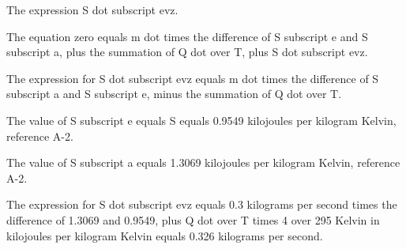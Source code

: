 The expression S dot subscript evz.

The equation zero equals m dot times the difference of S subscript e and S subscript a, plus the summation of Q dot over T, plus S dot subscript evz.

The expression for S dot subscript evz equals m dot times the difference of S subscript a and S subscript e, minus the summation of Q dot over T.

The value of S subscript e equals S equals 0.9549 kilojoules per kilogram Kelvin, reference A-2.

The value of S subscript a equals 1.3069 kilojoules per kilogram Kelvin, reference A-2.

The expression for S dot subscript evz equals 0.3 kilograms per second times the difference of 1.3069 and 0.9549, plus Q dot over T times 4 over 295 Kelvin in kilojoules per kilogram Kelvin equals 0.326 kilograms per second.